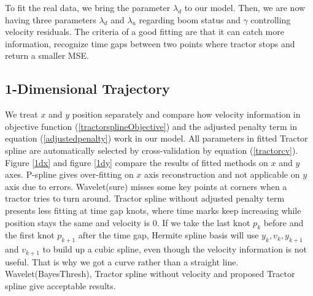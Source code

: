 To fit the real data, we bring the parameter $\lambda_d$ to our model. Then, we are now having three parameters $\lambda_d$ and $\lambda_u$ regarding boom status and $\gamma$ controlling velocity residuals. The criteria of a good fitting are that it can catch more information, recognize time gaps between two points where tractor stops and return a smaller MSE. 



\subsection{1-Dimensional Trajectory}

We treat $x$ and $y$ position separately and compare how velocity information in objective function (\ref{tractorsplineObjective}) and the adjusted penalty term in equation (\ref{adjustedpenalty}) work in our model. All parameters in fitted Tractor spline are automatically selected by cross-validation by equation (\ref{tractorcv}). Figure \ref{1dx} and figure \ref{1dy} compare the results of fitted methods on $x$ and $y$ axes. P-spline gives over-fitting on $x$ axis reconstruction and not applicable on $y$ axis due to errors. Wavelet(sure) misses some key points at corners when a tractor tries to turn around. Tractor spline without adjusted penalty term presents less fitting at time gap knots, where time marks keep increasing while position stays the same and velocity is 0. If we take the last knot $p_k$ before and the first knot $p_{k+1}$ after the time gap, Hermite spline basis will use $y_k, v_k, y_{k+1}$ and $v_{k+1}$ to build up a cubic spline, even though the velocity information is not useful. That is why we got a curve rather than a straight line. Wavelet(BayesThresh), Tractor spline without velocity and proposed Tractor spline give acceptable results.


